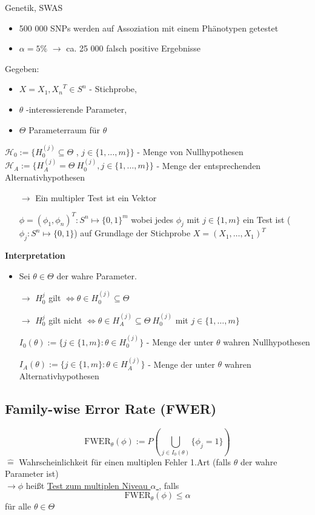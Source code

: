 \begin{exmp}
	Genetik, SWAS
	\begin{itemize}
		\item 500 000 SNPs werden auf Assoziation mit einem Phänotypen getestet
		\item $\alpha = 5\%$ $\rightarrow$ ca. 25 000 falsch positive Ergebnisse
	\end{itemize}
\end{exmp}
Gegeben:
\begin{itemize}
	\item $X= {X_1, X_n}^T \in S^n$ - Stichprobe,
	\item $\theta$ -interessierende Parameter,
	\item $\Theta$ Parameterraum für $\theta$
\end{itemize}
$\mathcal{H}_0 := \{ H_0^{(j)} \subseteq \Theta$ , $j \in \{1, \ldots, m\} \}$ - Menge von Nullhypothesen\\
$\mathcal{H}_A := \{ H_A^{(j)} = \Theta \ H_0^{(j)} , j \in \{1, \ldots, m\}\}$ - Menge der entsprechenden Alternativhypothesen
\begin{itemize}
	\item[$\rightarrow$] Ein multipler Test ist ein Vektor 
	\item[]$\phi = (\phi_1, \phi_n)^T: S^n \mapsto \{0,1\}^m$ 
wobei jedes $\phi_j$ mit $j \in \{1,m\}$ ein Test ist ($\phi_j: S^n \mapsto \{0,1\}$) auf Grundlage der Stichprobe $X = (X_1,\ldots, X_1)^T$
\end{itemize}
\textbf{Interpretation}
\begin{itemize}
	\item Sei $\theta \in \Theta$ der wahre Parameter.
	\item[$\rightarrow$] $H_0^{j}$  gilt $\Leftrightarrow \theta \in H_0^{(j)} \subseteq \Theta$
	\item[$\rightarrow$] $H_0^{j}$ gilt nicht $\Leftrightarrow \theta \in H_A^{(j)} \subseteq \Theta \ H_0^{(j)} $
mit $j \in \{1,\ldots,m\}$
	\item[]$I_0(\theta) := \{j \in \{1,m\} : \theta \in H_0^{(j)} \}$ - Menge der unter $\theta$ wahren Nullhypothesen
	\item[]$I_A(\theta) := \{j \in \{1,m\} : \theta \in H_A^{(j)} \}$ - Menge der unter $\theta$ wahren Alternativhypothesen
\end{itemize}


\subsection{Family-wise Error Rate (FWER) }
\[ \text{FWER}_{\theta}(\phi)  := P \left( \bigcup_{j\in I_{0}(\theta)} \{ \phi_j = 1\} \right) \]
$\mathrel{\widehat{=}}$ Wahrscheinlichkeit für einen multiplen Fehler 1.Art (falls $\theta$ der wahre Parameter ist) \\
$\rightarrow \phi$ heißt \underline{Test zum multiplen Niveau $\alpha$ }, falls
\[ \text{FWER}_{\theta}(\phi) \leq \alpha \]
für alle $\theta \in \Theta $

